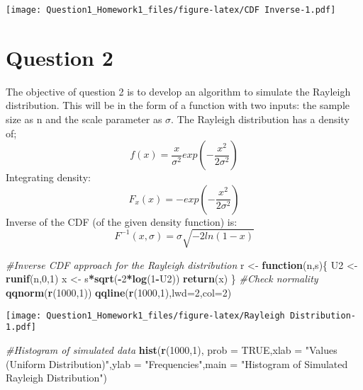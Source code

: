 \documentclass[
]{article}
\newenvironment{Shaded}{\begin{snugshade}}{\end{snugshade}}
\newcommand{\CommentTok}[1]{\textcolor[rgb]{0.56,0.35,0.01}{\textit{#1}}}
\newcommand{\ControlFlowTok}[1]{\textcolor[rgb]{0.13,0.29,0.53}{\textbf{#1}}}
\newcommand{\DataTypeTok}[1]{\textcolor[rgb]{0.13,0.29,0.53}{#1}}
\newcommand{\DecValTok}[1]{\textcolor[rgb]{0.00,0.00,0.81}{#1}}
\newcommand{\KeywordTok}[1]{\textcolor[rgb]{0.13,0.29,0.53}{\textbf{#1}}}
\newcommand{\NormalTok}[1]{#1}
\newcommand{\OperatorTok}[1]{\textcolor[rgb]{0.81,0.36,0.00}{\textbf{#1}}}
\newcommand{\OtherTok}[1]{\textcolor[rgb]{0.56,0.35,0.01}{#1}}
\newcommand{\StringTok}[1]{\textcolor[rgb]{0.31,0.60,0.02}{#1}}
\begin{document}
\texttt{[image: Question1\_Homework1\_files/figure-latex/CDF Inverse-1.pdf]}

\newpage

\hypertarget{question-2}{%
\section{Question 2}\label{question-2}}

The objective of question 2 is to develop an algorithm to simulate the
Rayleigh distribution. This will be in the form of a function with two
inputs: the sample size as n and the scale parameter as \(\sigma\). The
Rayleigh distribution has a density of;
\[f(x) = \frac{x}{\sigma^2}exp(-\frac{x^2}{2\sigma^2})\] Integrating
density: \[F_x(x) = -exp(-\frac{x^2}{2\sigma^2})\] Inverse of the CDF
(of the given density function) is:
\[F^{-1}(x,\sigma) = \sigma\sqrt{-2ln(1 - x)}\]

\begin{Shaded}
\begin{Highlighting}[]
\CommentTok{#Inverse CDF approach for the Rayleigh distribution}
\NormalTok{r <-}\StringTok{ }\ControlFlowTok{function}\NormalTok{(n,s)\{}
\NormalTok{  U2 <-}\StringTok{ }\KeywordTok{runif}\NormalTok{(n,}\DecValTok{0}\NormalTok{,}\DecValTok{1}\NormalTok{)}
\NormalTok{  x <-}\StringTok{ }\NormalTok{s}\OperatorTok{*}\KeywordTok{sqrt}\NormalTok{(}\OperatorTok{-}\DecValTok{2}\OperatorTok{*}\KeywordTok{log}\NormalTok{(}\DecValTok{1}\OperatorTok{-}\NormalTok{U2))}
  \KeywordTok{return}\NormalTok{(x)}
\NormalTok{\}}
\CommentTok{#Check normality}
\KeywordTok{qqnorm}\NormalTok{(}\KeywordTok{r}\NormalTok{(}\DecValTok{1000}\NormalTok{,}\DecValTok{1}\NormalTok{))}
\KeywordTok{qqline}\NormalTok{(}\KeywordTok{r}\NormalTok{(}\DecValTok{1000}\NormalTok{,}\DecValTok{1}\NormalTok{),}\DataTypeTok{lwd=}\DecValTok{2}\NormalTok{,}\DataTypeTok{col=}\DecValTok{2}\NormalTok{)}
\end{Highlighting}
\end{Shaded}

\texttt{[image: Question1\_Homework1\_files/figure-latex/Rayleigh Distribution-1.pdf]}

\begin{Shaded}
\begin{Highlighting}[]
\CommentTok{#Histogram of simulated data}
\KeywordTok{hist}\NormalTok{(}\KeywordTok{r}\NormalTok{(}\DecValTok{1000}\NormalTok{,}\DecValTok{1}\NormalTok{), }\DataTypeTok{prob =} \OtherTok{TRUE}\NormalTok{,}\DataTypeTok{xlab =} \StringTok{"Values (Uniform Distribution)"}\NormalTok{,}\DataTypeTok{ylab =} \StringTok{"Frequencies"}\NormalTok{,}\DataTypeTok{main =} \StringTok{"Histogram of Simulated Rayleigh Distribution"}\NormalTok{)}
\end{Highlighting}
\end{Shaded}
\end{document}
